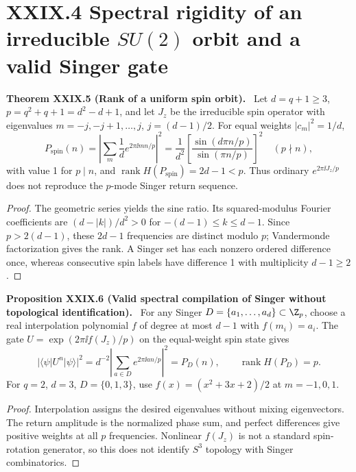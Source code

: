 \documentclass[11pt,a4paper,oneside]{book}
\DeclareMathOperator{\rank}{rank}\DeclareMathOperator{\Tr}{Tr}
\newcommand{\statement}[3]{\par\medskip\noindent\textbf{#1 #2 (#3).}\ }
\begin{document}
\section*{XXIX.4 Spectral rigidity of an irreducible $SU(2)$ orbit and a valid Singer gate}
\statement{Theorem}{XXIX.5}{Rank of a uniform spin orbit} Let $d=q+1\ge3$, $p=q^2+q+1=d^2-d+1$, and let $J_z$ be the irreducible spin operator with eigenvalues $m=-j,-j+1,\ldots,j$, $j=(d-1)/2$. For equal weights $|c_m|^2=1/d$,
\[P_{\mathrm{spin}}(n)=\left|\sum_m\frac1d e^{2\pi\ii mn/p}\right|^2=\frac1{d^2}\left[\frac{\sin(d\pi n/p)}{\sin(\pi n/p)}\right]^2\quad(p\nmid n),\]
with value 1 for $p\mid n$, and $\rank H(P_{\mathrm{spin}})=2d-1<p$. Thus ordinary $e^{2\pi\ii J_z/p}$ does not reproduce the $p$-mode Singer return sequence.
\begin{proof}The geometric series yields the sine ratio. Its squared-modulus Fourier coefficients are $(d-|k|)/d^2>0$ for $-(d-1)\le k\le d-1$. Since $p>2(d-1)$, these $2d-1$ frequencies are distinct modulo $p$; Vandermonde factorization gives the rank. A Singer set has each nonzero ordered difference once, whereas consecutive spin labels have difference 1 with multiplicity $d-1\ge2$.\end{proof}
\statement{Proposition}{XXIX.6}{Valid spectral compilation of Singer without topological identification} For any Singer $D=\{a_1,\ldots,a_d\}\subset\Z_p$, choose a real interpolation polynomial $f$ of degree at most $d-1$ with $f(m_i)=a_i$. The gate $U=\exp(2\pi\ii f(J_z)/p)$ on the equal-weight spin state gives
\[|\langle\psi|U^n|\psi\rangle|^2=d^{-2}\left|\sum_{a\in D}e^{2\pi\ii an/p}\right|^2=P_D(n),\qquad\rank H(P_D)=p.\]
For $q=2$, $d=3$, $D=\{0,1,3\}$, use $f(x)=(x^2+3x+2)/2$ at $m=-1,0,1$.
\begin{proof}Interpolation assigns the desired eigenvalues without mixing eigenvectors. The return amplitude is the normalized phase sum, and perfect differences give positive weights at all $p$ frequencies. Nonlinear $f(J_z)$ is not a standard spin-rotation generator, so this does not identify $S^3$ topology with Singer combinatorics.\end{proof}
\end{document}
